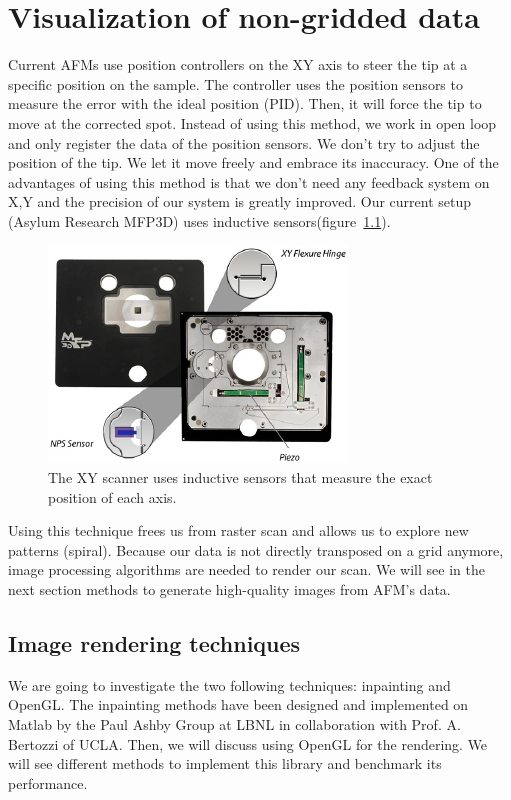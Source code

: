 \chapter{Visualization of non-gridded data}
 
Current AFMs use position controllers on the XY axis to steer the tip at a specific position on the sample. The controller uses the position sensors to measure the error with the ideal position (PID). Then, it will force the tip to move at the corrected spot. 
Instead of using this method, we work in open loop and only register the data of the position sensors. We don't try to adjust the position of the tip. We let it move freely and embrace its inaccuracy. One of the advantages of using this method is that we don't need any feedback system on X,Y and the precision of our system is greatly improved. Our current setup (Asylum Research MFP3D) uses inductive sensors(figure~\ref{fig:mfp3d}).

\begin{figure}[!ht]
  \centering
  \includegraphics[scale=1]{images/sensorsmfp3d.jpg}
    \caption{The XY scanner uses inductive sensors that measure the exact position of each axis. \cite{linkmpf3d}}
  \label{fig:mfp3d}
\end{figure}

Using this technique frees us from raster scan and allows us to explore new patterns (spiral). Because our data is not directly transposed on a grid  anymore, image processing algorithms are needed to render our scan. We will see in the next section methods to generate high-quality images from AFM's data.

\section{Image rendering techniques}

We are going to investigate the two following techniques: inpainting and OpenGL. The inpainting methods have been designed and implemented on Matlab by the Paul Ashby Group at LBNL in collaboration with Prof. A. Bertozzi of UCLA. Then, we will discuss using OpenGL for the rendering. We will see different methods to implement this library and benchmark its performance.

